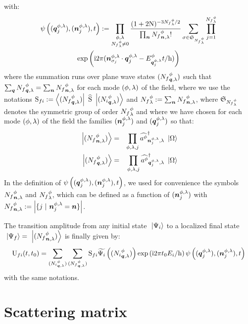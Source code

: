 with:
\begin{multline*}
\psi \left( ( \boldsymbol{q}^{\phi, \lambda}_j ), ( \boldsymbol{n}^{\phi, \lambda}_j ), t \right) := \prod_{\substack{\phi, \lambda \\ {N_f}^\phi_\lambda \neq 0}} \frac{(1+2 \mathrm N)^{-3 {N_f}^\phi_\lambda / 2} }{\prod_{\boldsymbol{n}} {N_f}^{\phi}_{{\boldsymbol{n}}, {\lambda}} !} \sum_{\sigma \in \mathfrak{S}_{{N_f}^\phi_\lambda}} \prod_{j = 1}^{{N_f}^\phi_\lambda} \\
\mathrm{exp} \left( {\mathrm{i} 2 \pi ( \boldsymbol{n}^{\phi, \lambda}_{\sigma_j} \cdot \boldsymbol{q}^{\phi, \lambda}_j - E^{\phi}_{\boldsymbol{q}^{\phi, \lambda}_j} t / \mathrm h )} \right)
\end{multline*}
where the summation runs over plane wave states $({N_f}^{\phi}_{{\boldsymbol{q}}, {\lambda}})$ such that $\sum_{\boldsymbol{q}} {N_f}^{\phi}_{{\boldsymbol{q}}, {\lambda}} = \sum_{\boldsymbol{n}} {N_f}^{\phi}_{{\boldsymbol{n}}, {\lambda}}$ for each mode $( \phi, \lambda )$ of the field, where we use the notations $\mathrm S_{{f}{i}} := \left\langle{({N_f}^{\phi}_{{\boldsymbol{q}}, {\lambda}})}\right|\  \widehat{\mathrm S} \ \left|{({N_i}^{\phi}_{{\boldsymbol{q}}, {\lambda}})}\right\rangle$ and ${N_f}^\phi_\lambda := \sum_{\boldsymbol{n}} {N_f}^{\phi}_{{\boldsymbol{n}}, {\lambda}}$, where $\mathfrak{S}_{{N_f}^\phi_\lambda}$ denotes the symmetric group of order ${N_f}^\phi_\lambda$ and where we have chosen for each mode $( \phi, \lambda )$ of the field the families $( \boldsymbol{n}^{\phi, \lambda}_j )$ and $( \boldsymbol{q}^{\phi, \lambda}_j )$ so that:
\begin{eqnarray*}
\ \left|{({N_f}^{\phi}_{{\boldsymbol{n}}, {\lambda}})}\right\rangle & = & \prod_{\phi, \lambda, j} \widehat{a^{\phi}}^{\dagger}_{{\boldsymbol{n}^{\phi, \lambda}_j}, {\lambda}} \ \left|{\Omega}\right\rangle \\
\ \left|{({N_f}^{\phi}_{{\boldsymbol{q}}, {\lambda}})}\right\rangle & = & \prod_{\phi, \lambda, j} \widehat{a^{\phi}}^{\dagger}_{{\boldsymbol{q}^{\phi, \lambda}_j}, {\lambda}} \ \left|{\Omega}\right\rangle
\end{eqnarray*}
In the definition of $\psi \left( ( \boldsymbol{q}^{\phi, \lambda}_j ), ( \boldsymbol{n}^{\phi, \lambda}_j ), t \right)$, we used for convenience the symbols ${N_f}^{\phi}_{{\boldsymbol{n}}, {\lambda}}$ and ${N_f}^\phi_\lambda$, which can be defined as a function of $( \boldsymbol{n}^{\phi, \lambda}_j )$ with $\bX {N_f} \pt \n \sp \eqdef \left|  \{ j\ |\ \n^{\pt, \sp}_j = \n \} \right|$.

The transition amplitude from any initial state $\ \left|{\Psi_i}\right\rangle$ to a localized final state $\ \left|{\Psi_f}\right\rangle = \ \left|{({N_f}^{\phi}_{{\boldsymbol{n}}, {\lambda}})}\right\rangle$ is finally given by:
\begin{equation*}
\mathrm U_{{f}{i}}({t},{t_0}) = \sum_{({N_i}^{\phi}_{{\boldsymbol{q}}, {\lambda}})} \sum_{({N_f}^{\phi}_{{\boldsymbol{q}}, {\lambda}})} \mathrm S_{{f}{i}} \widetilde{\Psi_i} \left( ({N_i}^{\phi}_{{\boldsymbol{q}}, {\lambda}}) \right) \mathrm{exp} \left( {\mathrm{i} 2 \pi t_0 E_i / \mathrm h} \right) \psi \left( ( \boldsymbol{q}^{\phi, \lambda}_j ), ( \boldsymbol{n}^{\phi, \lambda}_j ), t \right)
\end{equation*}
with the same notations.

\section{Scattering matrix}
\label{Scattering matrix}

